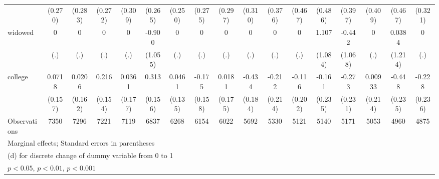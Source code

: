 {\begin{tabular}{l*{16}{c}}
                    &     (0.270)         &     (0.283)         &     (0.272)         &     (0.309)         &     (0.265)         &     (0.250)         &     (0.275)         &     (0.297)         &     (0.310)         &     (0.376)         &     (0.467)         &     (0.486)         &     (0.397)         &     (0.409)         &     (0.467)         &     (0.321)         \\
[1em]
widowed             &           0         &           0         &           0         &           0         &      -0.900         &           0         &           0         &           0         &           0         &           0         &           0         &       1.107         &      -0.442         &           0         &      0.0384         &           0         \\
                    &         (.)         &         (.)         &         (.)         &         (.)         &     (1.055)         &         (.)         &         (.)         &         (.)         &         (.)         &         (.)         &         (.)         &     (1.084)         &     (1.068)         &         (.)         &     (1.214)         &         (.)         \\
[1em]
college             &      0.0718         &      0.0206         &       0.216         &      0.0361         &       0.313\sym{*}  &      0.0461         &      -0.175         &      0.0181         &      -0.434\sym{*}  &      -0.212         &      -0.116         &      -0.161         &      -0.273         &     0.00933         &      -0.448         &      -0.228         \\
                    &     (0.157)         &     (0.162)         &     (0.154)         &     (0.177)         &     (0.156)         &     (0.135)         &     (0.158)         &     (0.175)         &     (0.184)         &     (0.214)         &     (0.202)         &     (0.235)         &     (0.231)         &     (0.214)         &     (0.235)         &     (0.236)         \\
\hline
Observations        &        7350         &        7296         &        7221         &        7119         &        6837         &        6268         &        6154         &        6022         &        5692         &        5330         &        5121         &        5140         &        5171         &        5053         &        4960         &        4875         \\
\hline\hline
\multicolumn{17}{l}{\footnotesize Marginal effects; Standard errors in parentheses}\\
\multicolumn{17}{l}{\footnotesize  (d) for discrete change of dummy variable from 0 to 1}\\
\multicolumn{17}{l}{\footnotesize \sym{*} \(p<0.05\), \sym{**} \(p<0.01\), \sym{***} \(p<0.001\)}\\
\end{tabular}
}
